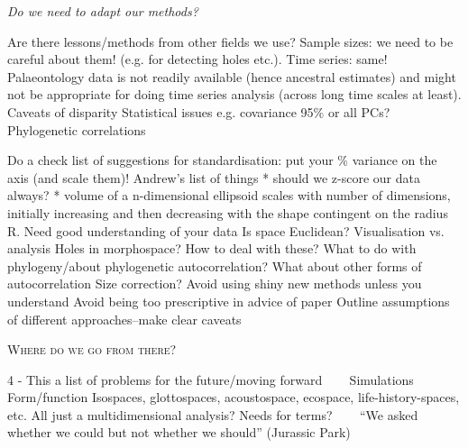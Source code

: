 \documentclass[12pt,letterpaper]{article}
\renewcommand{\section}[1]{%
\bigskip
\begin{center}
\begin{Large}
\normalfont\scshape #1
\medskip
\end{Large}
\end{center}}
\renewcommand{\subsection}[1]{%
\bigskip
\begin{center}
\begin{large}
\normalfont\itshape #1
\end{large}
\end{center}}
\begin{document}
\subsection{Do we need to adapt our methods?}
Are there lessons/methods from other fields we use?
Sample sizes: we need to be careful about them! (e.g. for detecting holes etc.).
Time series: same! Palaeontology data is not readily available (hence ancestral estimates) and might not be appropriate for doing time series analysis (across long time scales at least).
Caveats of disparity
Statistical issues e.g. covariance
95\% or all PCs?
Phylogenetic correlations

Do a check list of suggestions for standardisation: put your \% variance on the axis (and scale them)!
Andrew’s list of things
* should we z-score our data always?
* volume of a n-dimensional ellipsoid scales with number of dimensions, initially increasing and then decreasing with the shape contingent on the radius R.
Need good understanding of your data
Is space Euclidean?
Visualisation vs. analysis
Holes in morphospace? How to deal with these?
What to do with phylogeny/about phylogenetic autocorrelation?
What about other forms of autocorrelation
Size correction?
Avoid using shiny new methods unless you understand
Avoid being too prescriptive in advice of paper
Outline assumptions of different approaches--make clear caveats




\section{Where do we go from there?}
4 - This a list of problems for the future/moving forward
    Simulations 
    Form/function
Isospaces, glottospaces, acoustospace, ecospace, life-history-spaces, etc. All just a multidimensional analysis? Needs for terms?
    
``We asked whether we could but not whether we should'' (Jurassic Park)







\end{document}
